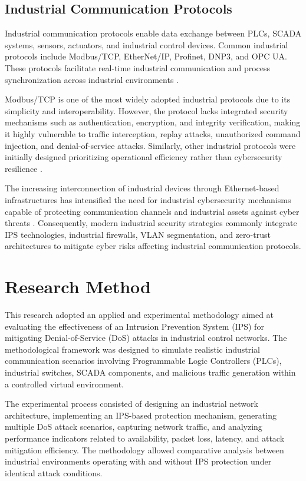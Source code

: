 \documentclass[sigconf]{acmart}
\begin{document}
\subsection{Industrial Communication Protocols}
Industrial communication protocols enable data exchange between PLCs, SCADA systems, sensors, actuators, and industrial control devices. Common industrial protocols include Modbus/TCP, EtherNet/IP, Profinet, DNP3, and OPC UA. These protocols facilitate real-time industrial communication and process synchronization across industrial environments \cite{Pan2020PLC}.

Modbus/TCP is one of the most widely adopted industrial protocols due to its simplicity and interoperability. However, the protocol lacks integrated security mechanisms such as authentication, encryption, and integrity verification, making it highly vulnerable to traffic interception, replay attacks, unauthorized command injection, and denial-of-service attacks. Similarly, other industrial protocols were initially designed prioritizing operational efficiency rather than cybersecurity resilience \cite{Yu2019IDS}.

The increasing interconnection of industrial devices through Ethernet-based infrastructures has intensified the need for industrial cybersecurity mechanisms capable of protecting communication channels and industrial assets against cyber threats \cite{Lin2021Protocols}. Consequently, modern industrial security strategies commonly integrate IPS technologies, industrial firewalls, VLAN segmentation, and zero-trust architectures to mitigate cyber risks affecting industrial communication protocols.


\section{Research Method}
This research adopted an applied and experimental methodology aimed at evaluating the effectiveness of an Intrusion Prevention System (IPS) for mitigating Denial-of-Service (DoS) attacks in industrial control networks. The methodological framework was designed to simulate realistic industrial communication scenarios involving Programmable Logic Controllers (PLCs), industrial switches, SCADA components, and malicious traffic generation within a controlled virtual environment.

The experimental process consisted of designing an industrial network architecture, implementing an IPS-based protection mechanism, generating multiple DoS attack scenarios, capturing network traffic, and analyzing performance indicators related to availability, packet loss, latency, and attack mitigation efficiency. The methodology allowed comparative analysis between industrial environments operating with and without IPS protection under identical attack conditions.
\end{document}
